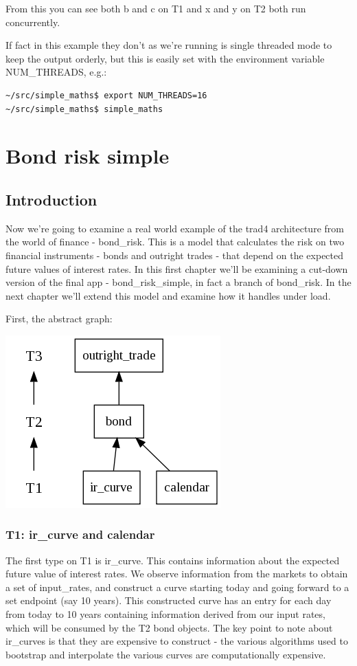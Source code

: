 \documentclass{report}
\begin{document}
From this you can see both b and c on T1 and x and y on T2 both run concurrently. 

If fact in this example they don't as we're running is single threaded mode to keep the output orderly, but this is easily set with the environment variable NUM_THREADS, e.g.:

\begin{verbatim}
~/src/simple_maths$ export NUM_THREADS=16
~/src/simple_maths$ simple_maths
\end{verbatim}

\chapter{Bond risk simple}

\section{Introduction}

Now we're going to examine a real world example of the trad4 architecture from the world of finance - bond_risk. This is a model that calculates the risk on two financial instruments - bonds and outright trades - that depend on the expected future values of interest rates. In this first chapter we'll be examining a cut-down version of the final app - bond_risk_simple, in fact a branch of bond_risk. In the next chapter we'll extend this model and examine how it handles under load.

First, the abstract graph:

\includegraphics[scale=0.5]{bondrisksimpleabstract.png}

\subsection{T1: ir_curve and calendar}

The first type on T1 is ir_curve. This contains information about the expected future value of interest rates. We observe information from the markets to obtain a set of input_rates, and construct a curve starting today and going forward to a set endpoint (say 10 years). This constructed curve has an entry for each day from today to 10 years containing information derived from our input rates, which will be consumed by the T2 bond objects. The key point to note about ir_curves is that they are expensive to construct - the various algorithms used to bootstrap and interpolate the various curves are computationally expensive.
\end{document}
